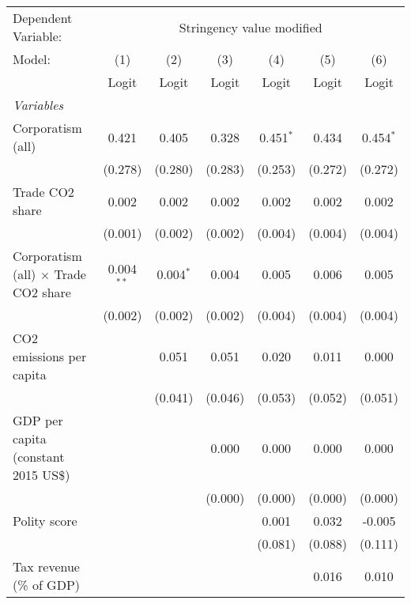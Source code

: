 
\begingroup
\centering
\begin{tabular}{lcccccc}
   \toprule
   Dependent Variable: & \multicolumn{6}{c}{Stringency value modified}\\
   Model:                                      & (1)          & (2)         & (3)     & (4)         & (5)     & (6)\\  
                                               &  Logit       & Logit       & Logit   & Logit       & Logit   & Logit\\  
   \midrule
   \emph{Variables}\\
   Corporatism (all)                           & 0.421        & 0.405       & 0.328   & 0.451$^{*}$ & 0.434   & 0.454$^{*}$\\   
                                               & (0.278)      & (0.280)     & (0.283) & (0.253)     & (0.272) & (0.272)\\   
   Trade CO2 share                             & 0.002        & 0.002       & 0.002   & 0.002       & 0.002   & 0.002\\   
                                               & (0.001)      & (0.002)     & (0.002) & (0.004)     & (0.004) & (0.004)\\   
   Corporatism (all) $\times$ Trade CO2 share  & 0.004$^{**}$ & 0.004$^{*}$ & 0.004   & 0.005       & 0.006   & 0.005\\   
                                               & (0.002)      & (0.002)     & (0.002) & (0.004)     & (0.004) & (0.004)\\   
   CO2 emissions per capita                    &              & 0.051       & 0.051   & 0.020       & 0.011   & 0.000\\   
                                               &              & (0.041)     & (0.046) & (0.053)     & (0.052) & (0.051)\\   
   GDP per capita (constant 2015 US\$)         &              &             & 0.000   & 0.000       & 0.000   & 0.000\\   
                                               &              &             & (0.000) & (0.000)     & (0.000) & (0.000)\\   
   Polity score                                &              &             &         & 0.001       & 0.032   & -0.005\\   
                                               &              &             &         & (0.081)     & (0.088) & (0.111)\\   
   Tax revenue (\% of GDP)                     &              &             &         &             & 0.016   & 0.010\\   

\end{tabular}
